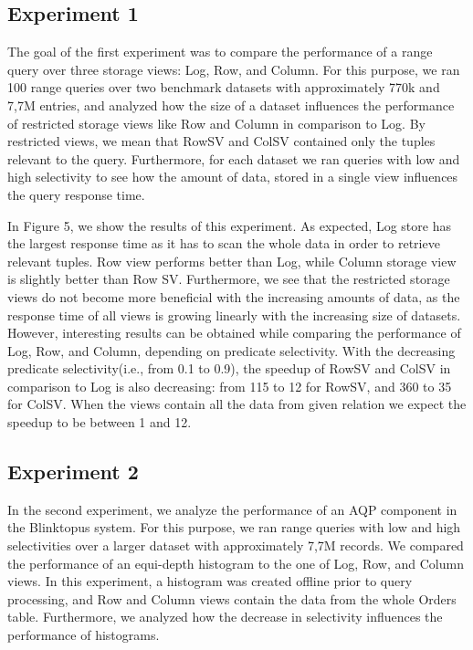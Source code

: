 \documentclass[10pt, conference, compsocconf]{IEEEtran}
\begin{document}
\subsection{Experiment 1}
The goal of the first experiment was to compare the performance of a range query over three storage views: Log, Row, and Column. For this purpose, we ran 100 range queries over two benchmark datasets with approximately 770k and 7,7M entries, and analyzed how the size of a dataset influences the performance of restricted storage views like Row and Column in comparison to Log. By restricted views, we mean that RowSV and ColSV contained only the tuples relevant to the query. Furthermore, for each dataset we ran queries with low and high selectivity to see how the amount of data, stored in a single view influences the query response time.

In Figure 5, we show the results of this experiment. As expected, Log store has the largest response time as it has to scan the whole data in order to retrieve relevant tuples. Row view performs better than Log, while Column storage view is slightly better than Row SV. Furthermore, we see that the restricted storage views do not become more beneficial with the increasing amounts of data, as the response time of all views is growing linearly with the increasing size of datasets. However, interesting results can be obtained while comparing the performance of Log, Row, and Column, depending on predicate selectivity. With the decreasing predicate selectivity(i.e., from 0.1 to 0.9), the speedup of RowSV and ColSV in comparison to Log is also decreasing: from 115 to 12 for RowSV, and 360 to 35 for ColSV. When the views contain all the data from given relation we expect the speedup to be between 1 and 12.

\subsection{Experiment 2}
In the second experiment, we analyze the performance of an AQP component in the Blinktopus system. For this purpose, we ran range queries with low and high selectivities over a larger dataset with approximately 7,7M records. We compared the performance of an equi-depth histogram to the one of Log, Row, and Column views. In this experiment, a histogram was created offline prior to query processing, and Row and Column views contain the data from the whole Orders table. Furthermore, we analyzed how the decrease in selectivity influences the performance of histograms.
\end{document}
